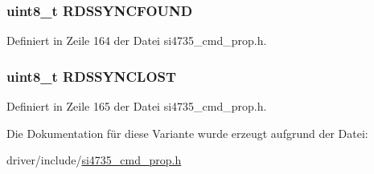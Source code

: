 \hypertarget{unionfm__rds__status__resp1_a924e0044d60c0d490d165ceb3ef6b23d}{}
\subsubsection[{R\+D\+S\+S\+Y\+N\+C\+F\+O\+U\+N\+D}]{\setlength{\rightskip}{0pt plus 5cm}uint8\+\_\+t R\+D\+S\+S\+Y\+N\+C\+F\+O\+U\+N\+D}\label{unionfm__rds__status__resp1_a924e0044d60c0d490d165ceb3ef6b23d}


Definiert in Zeile 164 der Datei si4735\+\_\+cmd\+\_\+prop.\+h.

\hypertarget{unionfm__rds__status__resp1_a73c3d34273c45dd08fcb341496c08052}{}
\subsubsection[{R\+D\+S\+S\+Y\+N\+C\+L\+O\+S\+T}]{\setlength{\rightskip}{0pt plus 5cm}uint8\+\_\+t R\+D\+S\+S\+Y\+N\+C\+L\+O\+S\+T}\label{unionfm__rds__status__resp1_a73c3d34273c45dd08fcb341496c08052}


Definiert in Zeile 165 der Datei si4735\+\_\+cmd\+\_\+prop.\+h.



Die Dokumentation für diese Variante wurde erzeugt aufgrund der Datei\+:\begin{DoxyCompactItemize}
\item 
driver/include/\hyperlink{si4735__cmd__prop_8h}{si4735\+\_\+cmd\+\_\+prop.\+h}\end{DoxyCompactItemize}
